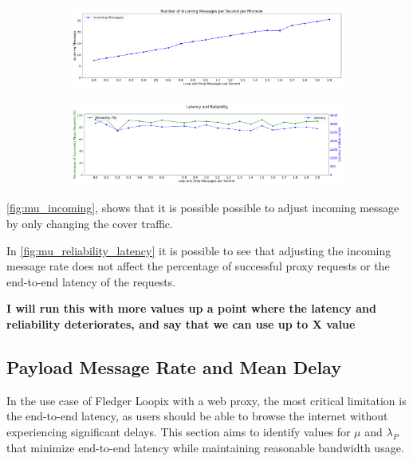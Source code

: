 \documentclass[a4paper,11pt,oneside]{report}
\begin{document}
\begin{figure}[H]
    \centering
    \begin{subfigure}{\textwidth}
        \centering
        \includegraphics[width=\textwidth]{plots/mu_incoming_messages.png}
        \caption{}
        \label{fig:mu_incoming}
    \end{subfigure}
    \hfill
    \centering
    \begin{subfigure}{\textwidth}
        \centering
        \includegraphics[width=\textwidth]{plots/mu_reliability_latency.png}
        \caption{}
        \label{fig:mu_reliability_latency}
    \end{subfigure}
\end{figure}

\autoref{fig:mu_incoming}, shows that it is possible possible to adjust incoming message by only changing the cover traffic.

In \autoref{fig:mu_reliability_latency} it is possible to see that adjusting the incoming message rate does not affect the percentage of successful proxy requests or the end-to-end latency of the requests.

\textbf{I will run this with more values up a point where the latency and reliability deteriorates, and say that we can use up to X value}

\subsection{Payload Message Rate and Mean Delay}
In the use case of Fledger Loopix with a web proxy, the most critical limitation is the end-to-end latency, as users should be able to browse the internet without experiencing significant delays. This section aims to identify values for \(\mu\) and \(\lambda_P\) that minimize end-to-end latency while maintaining reasonable bandwidth usage.
\end{document}
